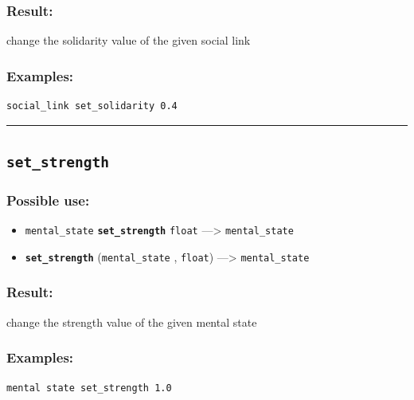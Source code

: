 \documentclass[]{book}
\providecommand{\tightlist}{%
  \setlength{\itemsep}{0pt}\setlength{\parskip}{0pt}}
\theoremstyle{definition}
\theoremstyle{definition}
\theoremstyle{definition}
\theoremstyle{remark}
\begin{document}
\subsubsection{Result:}\label{result-449}

change the solidarity value of the given social link

\subsubsection{Examples:}\label{examples-322}

\begin{verbatim}
social_link set_solidarity 0.4 
\end{verbatim}

\begin{center}\rule{0.5\linewidth}{\linethickness}\end{center}

\subsection{\texorpdfstring{\texttt{set\_strength}}{set\_strength}}\label{set_strength}

\subsubsection{Possible use:}\label{possible-use-466}

\begin{itemize}
\tightlist
\item
  \texttt{mental\_state} \textbf{\texttt{set\_strength}} \texttt{float}
  ---\textgreater{} \texttt{mental\_state}
\item
  \textbf{\texttt{set\_strength}} (\texttt{mental\_state} ,
  \texttt{float}) ---\textgreater{} \texttt{mental\_state}
\end{itemize}

\subsubsection{Result:}\label{result-450}

change the strength value of the given mental state

\subsubsection{Examples:}\label{examples-323}

\begin{verbatim}
mental state set_strength 1.0 
\end{verbatim}
\end{document}
